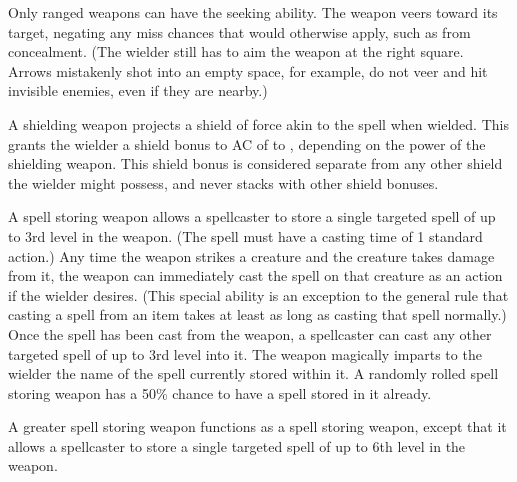 
 Only ranged weapons can have the seeking ability. The weapon veers toward its target, negating any miss chances that would otherwise apply, such as from concealment. (The wielder still has to aim the weapon at the right square. Arrows mistakenly shot into an empty space, for example, do not veer and hit invisible enemies, even if they are nearby.)


 A shielding weapon projects a shield of force akin to the  spell when wielded. This grants the wielder a shield bonus to AC of  to , depending on the power of the shielding weapon. This shield bonus is considered separate from any other shield the wielder might possess, and never stacks with other shield bonuses.

 A spell storing weapon allows a spellcaster to store a single targeted spell of up to 3rd level in the weapon. (The spell must have a casting time of  1 standard action.) Any time the weapon strikes a creature and the creature takes damage from it, the weapon can immediately cast the spell on that creature as an  action if the wielder desires. (This special ability is an exception to the general rule that casting a spell from an item takes at least as long as casting that spell normally.) Once the spell has been cast from the weapon, a spellcaster can cast any other targeted spell of up to 3rd level into it. The weapon magically imparts to the wielder the name of the spell currently stored within it. A randomly rolled spell storing weapon has a 50\% chance to have a spell stored in it already.


 A greater spell storing weapon functions as a spell storing weapon, except that it allows a spellcaster to store a single targeted spell of up to 6th level in the weapon.


